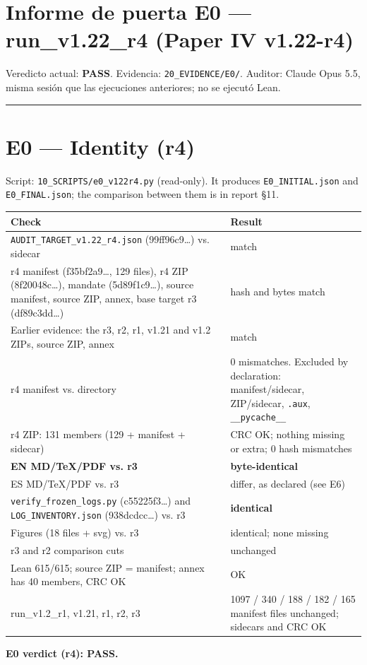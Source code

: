 \documentclass[
]{article}
\author{}
\date{}
\newcounter{none} %
\begin{document}
\section{Informe de puerta E0 --- run\_v1.22\_r4 (Paper IV
v1.22-r4)}\label{informe-de-puerta-e0--run_v122_r4-paper-iv-v122-r4}

Veredicto actual: \textbf{PASS}. Evidencia: \texttt{20\_EVIDENCE/E0/}.
Auditor: Claude Opus 5.5, misma sesión que las ejecuciones anteriores;
no se ejecutó Lean.

\begin{center}\rule{0.5\linewidth}{0.5pt}\end{center}

\section{E0 --- Identity (r4)}\label{e0--identity-r4}

Script: \texttt{10\_SCRIPTS/e0\_v122r4.py} (read-only). It produces
\texttt{E0\_INITIAL.json} and \texttt{E0\_FINAL.json}; the comparison
between them is in report §11.

{\def\LTcaptype{none} %
\begin{longtable}[]{@{}ll@{}}
\toprule\noalign{}
Check & Result \\
\midrule\noalign{}
\endhead
\bottomrule\noalign{}
\endlastfoot
\texttt{AUDIT\_TARGET\_v1.22\_r4.json} (99ff96c9\ldots) vs. sidecar &
match \\
r4 manifest (f35bf2a9\ldots, 129 files), r4 ZIP (8f20048c\ldots),
mandate (5d89f1c9\ldots), source manifest, source ZIP, annex, base
target r3 (df89c3dd\ldots) & hash and bytes match \\
Earlier evidence: the r3, r2, r1, v1.21 and v1.2 ZIPs, source ZIP, annex
& match \\
r4 manifest vs. directory & 0 mismatches. Excluded by declaration:
manifest/sidecar, ZIP/sidecar, \texttt{.aux},
\texttt{\_\_pycache\_\_} \\
r4 ZIP: 131 members (129 + manifest + sidecar) & CRC OK; nothing missing
or extra; 0 hash mismatches \\
\textbf{EN MD/TeX/PDF vs. r3} & \textbf{byte-identical} \\
ES MD/TeX/PDF vs. r3 & differ, as declared (see E6) \\
\texttt{verify\_frozen\_logs.py} (c55225f3\ldots) and
\texttt{LOG\_INVENTORY.json} (938dcdcc\ldots) vs. r3 &
\textbf{identical} \\
Figures (18 files + svg) vs. r3 & identical; none missing \\
r3 and r2 comparison cuts & unchanged \\
Lean 615/615; source ZIP = manifest; annex has 40 members, CRC OK &
OK \\
run\_v1.2\_r1, v1.21, r1, r2, r3 & 1097 / 340 / 188 / 182 / 165 manifest
files unchanged; sidecars and CRC OK \\
\end{longtable}
}

\textbf{E0 verdict (r4): PASS.}
\end{document}
